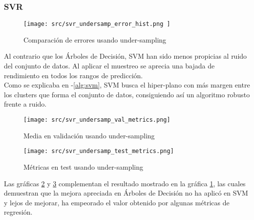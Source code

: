 \subsubsection*{SVR}
\begin{figure}[H]
	\centering
	\texttt{[image: src/svr\_undersamp\_error\_hist.png ]}
	\caption{Comparación de errores usando under-sampling}
	\label{fig:cmp_error_svr}
\end{figure}
Al contrario que los Árboles de Decisión, SVM han sido menos propicias al ruido del conjunto de datos. Al aplicar el muestreo se aprecia una bajada de rendimiento en todos los rangos de predicción. \\
Como se explicaba en -\ref{alg:svm}, SVM busca el hiper-plano con más margen entre los clusters que forma el conjunto de datos, consiguiendo así un algoritmo robusto frente a ruido.
\begin{figure}[H]
	\centering
	\texttt{[image: src/svr\_undersamp\_val\_metrics.png]}
	\caption{Media en validación usando under-sampling}
	\label{fig:cmp_val_svr}
\end{figure}
\begin{figure}[H]
	\centering
	\texttt{[image: src/svr\_undersamp\_test\_metrics.png]}
	\caption{Métricas en test usando under-sampling}
	\label{fig:cmp_test_svr}
\end{figure}
Las gráficas \ref{fig:cmp_val_svr} y \ref{fig:cmp_test_svr} complementan el resultado mostrado en la gráfica \ref{fig:cmp_error_svr}, las cuales demuestran que la mejora apreciada en Árboles de Decisión no ha aplicó en SVM y lejos de mejorar, ha empeorado el valor obtenido por algunas métricas de regresión.\\
